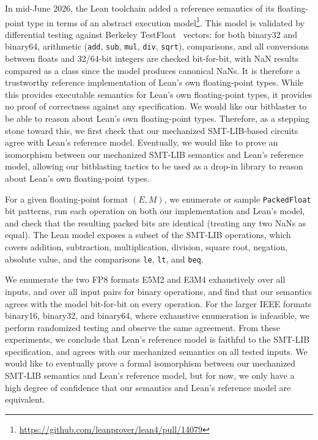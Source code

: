 In mid-June 2026, the Lean toolchain added a reference semantics of its
floating-point type in terms of an abstract execution model\footnote{\url{https://github.com/leanprover/lean4/pull/14079}}.
This model is validated by differential testing against Berkeley TestFloat~\cite{testfloat,softfloat} vectors:
for both binary32 and binary64, arithmetic (\texttt{add}, \texttt{sub}, \texttt{mul}, \texttt{div}, \texttt{sqrt}),
comparisons, and all conversions between floats and 32/64-bit integers are checked bit-for-bit,
with NaN results compared as a class since the model produces canonical NaNs.
It is therefore a trustworthy reference implementation of Lean's own floating-point types.
While this provides executable semantics for Lean's own floating-point types,
it provides no proof of correctness against any specification.
We would like our bitblaster to be able to reason about Lean's own floating-point types. Therefore, as a stepping stone toward this,
we first check that our mechanized SMT-LIB-based circuits agree with Lean's reference model.
Eventually, we would like to prove an isomorphism between our mechanized SMT-LIB semantics and Lean's reference model,
allowing our bitblasting tactics to be used as a drop-in library to reason about Lean's own floating-point types.

For a given floating-point format $(E, M)$, we enumerate or sample \texttt{PackedFloat} bit patterns,
run each operation on both our implementation and Lean's model, and check that the
resulting packed bits are identical (treating any two NaNs as equal).
The Lean model exposes a subset of the SMT-LIB operations,
which covers addition, subtraction, multiplication, division, square root,
negation, absolute value, and the comparisons \texttt{le}, \texttt{lt}, and \texttt{beq}.

We enumerate the two FP8 formats E5M2 and E3M4 exhaustively over all inputs, and
over all input pairs for binary operations, and find that our semantics agrees with the model bit-for-bit on every operation.
For the larger IEEE formats binary16, binary32, and binary64, where exhaustive
enumeration is infeasible, we perform randomized testing and observe the same agreement.
From these experiments, we conclude that Lean's reference model is faithful to the SMT-LIB specification,
and agrees with our mechanized semantics on all tested inputs.
We would like to eventually prove a formal isomorphism between our mechanized SMT-LIB semantics and Lean's reference model,
but for now, we only have a high degree of confidence that our semantics and Lean's reference model are equivalent.


